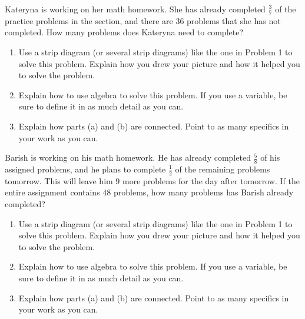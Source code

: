 \documentclass[nooutcomes,noauthor]{ximera}
\begin{document}
\newpage

\begin{problem}
Kateryna is working on her math homework. She has already completed $\frac{3}{7}$ of the practice problems in the section, and there are $36$ problems that she has not completed. How many problems does Kateryna need to complete?


\begin{enumerate}
	\item Use a strip diagram (or several strip diagrams) like the one in Problem 1 to solve this problem. Explain how you drew your picture and how it helped you to solve the problem.
	\item Explain how to use algebra to solve this problem. If you use a variable, be sure to define it in as much detail as you can.
	\item Explain how parts (a) and (b) are connected. Point to as many specifics in your work as you can.
\end{enumerate}
\end{problem}





\begin{problem}
Barish is working on his math homework. He has already completed $\frac{5}{8}$ of his assigned problems, and he plans to complete $\frac{1}{2}$ of the remaining problems tomorrow. This will leave him $9$ more problems for the day after tomorrow. If the entire assignment contains $48$ problems, how many problems has Barish already completed?


\begin{enumerate}
	\item Use a strip diagram (or several strip diagrams) like the one in Problem 1 to solve this problem. Explain how you drew your picture and how it helped you to solve the problem.
	\item Explain how to use algebra to solve this problem. If you use a variable, be sure to define it in as much detail as you can.
	\item Explain how parts (a) and (b) are connected. Point to as many specifics in your work as you can.
\end{enumerate}
\end{problem}
\end{document}
